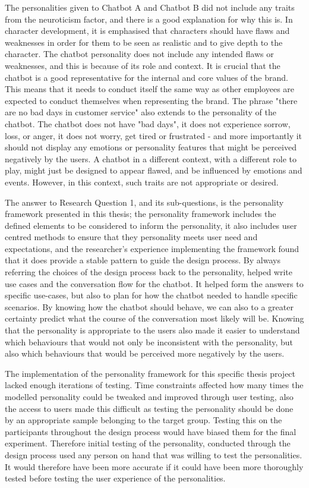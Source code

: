 The personalities given to Chatbot A and Chatbot B did not include any traits from the neuroticism factor, and there is a good explanation for why this is. In character development, it is emphasised that characters should have flaws and weaknesses in order for them to be seen as realistic and to give depth to the character. The chatbot personality does not include any intended flaws or weaknesses, and this is because of its role and context. It is crucial that the chatbot is a good representative for the internal and core values of the brand. This means that it needs to conduct itself the same way as other employees are expected to conduct themselves when representing the brand. The phrase "there are no bad days in customer service" also extends to the personality of the chatbot. The chatbot does not have "bad days", it does not experience sorrow, loss, or anger, it does not worry, get tired or frustrated - and more importantly it should not display any emotions or personality features that might be perceived negatively by the users. A chatbot in a different context, with a different role to play, might just be designed to appear flawed, and be influenced by emotions and events. However, in this context, such traits are not appropriate or desired.

The answer to Research Question 1, and its sub-questions, is the personality framework presented in this thesis; the personality framework includes the defined elements to be considered to inform the personality, it also includes user centred methods to ensure that they personality meets user need and expectations, and the researcher's experience implementing the framework found that it does provide a stable pattern to guide the design process. By always referring the choices of the design process back to the personality, helped write use cases and the conversation flow for the chatbot. It helped form the answers to specific use-cases, but also to plan for how the chatbot needed to handle specific scenarios. By knowing how the chatbot should behave, we can also to a greater certainty predict what the course of the conversation most likely will be. Knowing that the personality is appropriate to the users also made it easier to understand which behaviours that would not only be inconsistent with the personality, but also which behaviours that would be perceived more negatively by the users.

The implementation of the personality framework for this specific thesis project lacked enough iterations of testing. Time constraints affected how many times the modelled personality could be tweaked and improved through user testing, also the access to users made this difficult as testing the personality should be done by an appropriate sample belonging to the target group. Testing this on the participants throughout the design process would have biased them for the final experiment. Therefore initial testing of the personality, conducted through the design process used any person on hand that was willing to test the personalities. It would therefore have been more accurate if it could have been more thoroughly tested before testing the user experience of the personalities.

